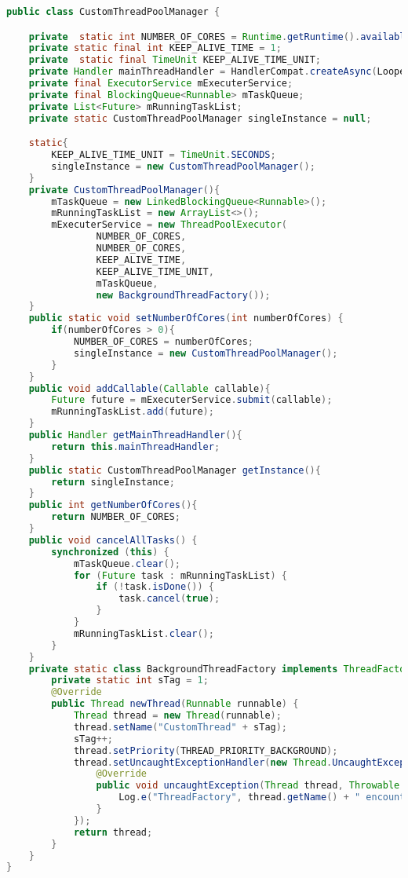 \begin{lstlisting}[language=java,caption={der CustomThreadManager aus der EnergyEfficience App},label=lst:CustomThreadManager]
public class CustomThreadPoolManager {

    private  static int NUMBER_OF_CORES = Runtime.getRuntime().availableProcessors();
    private static final int KEEP_ALIVE_TIME = 1;
    private  static final TimeUnit KEEP_ALIVE_TIME_UNIT;
    private Handler mainThreadHandler = HandlerCompat.createAsync(Looper.getMainLooper());
    private final ExecutorService mExecuterService;
    private final BlockingQueue<Runnable> mTaskQueue;
    private List<Future> mRunningTaskList;
    private static CustomThreadPoolManager singleInstance = null;

    static{
        KEEP_ALIVE_TIME_UNIT = TimeUnit.SECONDS;
        singleInstance = new CustomThreadPoolManager();
    }
    private CustomThreadPoolManager(){
        mTaskQueue = new LinkedBlockingQueue<Runnable>();
        mRunningTaskList = new ArrayList<>();
        mExecuterService = new ThreadPoolExecutor(
                NUMBER_OF_CORES,
                NUMBER_OF_CORES,
                KEEP_ALIVE_TIME,
                KEEP_ALIVE_TIME_UNIT,
                mTaskQueue,
                new BackgroundThreadFactory());
    }
    public static void setNumberOfCores(int numberOfCores) {
        if(numberOfCores > 0){
            NUMBER_OF_CORES = numberOfCores;
            singleInstance = new CustomThreadPoolManager();
        }
    }
    public void addCallable(Callable callable){
        Future future = mExecuterService.submit(callable);
        mRunningTaskList.add(future);
    }
    public Handler getMainThreadHandler(){
        return this.mainThreadHandler;
    }
    public static CustomThreadPoolManager getInstance(){
        return singleInstance;
    }
    public int getNumberOfCores(){
        return NUMBER_OF_CORES;
    }
    public void cancelAllTasks() {
        synchronized (this) {
            mTaskQueue.clear();
            for (Future task : mRunningTaskList) {
                if (!task.isDone()) {
                    task.cancel(true);
                }
            }
            mRunningTaskList.clear();
        }
    }
    private static class BackgroundThreadFactory implements ThreadFactory {
        private static int sTag = 1;
        @Override
        public Thread newThread(Runnable runnable) {
            Thread thread = new Thread(runnable);
            thread.setName("CustomThread" + sTag);
            sTag++;
            thread.setPriority(THREAD_PRIORITY_BACKGROUND);
            thread.setUncaughtExceptionHandler(new Thread.UncaughtExceptionHandler() {
                @Override
                public void uncaughtException(Thread thread, Throwable ex) {
                    Log.e("ThreadFactory", thread.getName() + " encountered an error: " + ex.getMessage());
                }
            });
            return thread;
        }
    }
}
\end{lstlisting}

